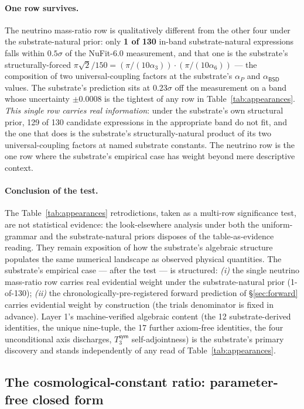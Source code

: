 \documentclass[11pt,a4paper]{amsart}
\theoremstyle{plain}
\theoremstyle{definition}
\begin{document}
\paragraph{One row survives.} The neutrino mass-ratio row is qualitatively different from the other four under the substrate-natural prior: only \textbf{1 of 130} in-band substrate-natural expressions falls within $0.5\sigma$ of the NuFit-6.0 measurement, and that one is the substrate's structurally-forced $\pi\sqrt{2}/150 = (\pi/(10\alpha_3)) \cdot (\pi/(10\alpha_6))$ --- the composition of two universal-coupling factors at the substrate's $\alpha_P$ and $\alpha_{\textsf{BSD}}$ values. The substrate's prediction sits at $0.23\sigma$ off the measurement on a band whose uncertainty $\pm 0.0008$ is the tightest of any row in Table~\ref{tab:appearances}. \emph{This single row carries real information}: under the substrate's own structural prior, 129 of 130 candidate expressions in the appropriate band do not fit, and the one that does is the substrate's structurally-natural product of its two universal-coupling factors at named substrate constants. The neutrino row is the one row where the substrate's empirical case has weight beyond mere descriptive context.

\paragraph{Conclusion of the test.} The Table~\ref{tab:appearances} retrodictions, taken as a multi-row significance test, are not statistical evidence: the look-elsewhere analysis under both the uniform-grammar and the substrate-natural priors disposes of the table-as-evidence reading. They remain exposition of how the substrate's algebraic structure populates the same numerical landscape as observed physical quantities. The substrate's empirical case --- after the test --- is structured: \emph{(i)} the single neutrino mass-ratio row carries real evidential weight under the substrate-natural prior (1-of-130); \emph{(ii)} the chronologically-pre-registered forward prediction of \S\ref{sec:forward} carries evidential weight by construction (the trials denominator is fixed in advance). Layer 1's machine-verified algebraic content (the 12 substrate-derived identities, the unique nine-tuple, the 17 further axiom-free identities, the four unconditional axis discharges, $T_3^{\textsf{sym}}$ self-adjointness) is the substrate's primary discovery and stands independently of any read of Table~\ref{tab:appearances}.

\subsection{The cosmological-constant ratio: parameter-free closed form}\label{subsec:lambdaeff}
\end{document}
